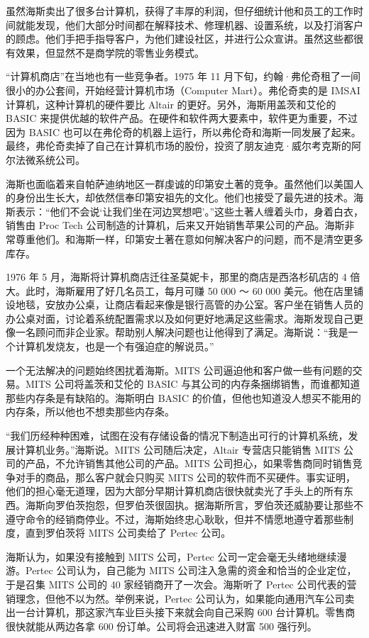 \documentclass[12pt,UTF8]{ctexbook}
\begin{document}
虽然海斯卖出了很多台计算机，获得了丰厚的利润，但仔细统计他和员工的工作时间就能发现，他们大部分时间都在解释技术、修理机器、设置系统，以及打消客户的顾虑。他们手把手指导客户，为他们建设社区，并进行公众宣讲。虽然这些都很有效果，但显然不是商学院的零售业务模式。

“计算机商店”在当地也有一些竞争者。1975 年 11 月下旬，约翰·弗伦奇租了一间很小的办公套间，开始经营计算机市场（Computer Mart）。弗伦奇卖的是 IMSAI 计算机，这种计算机的硬件要比 Altair 的更好。另外，海斯用盖茨和艾伦的 BASIC 来提供优越的软件产品。在硬件和软件两大要素中，软件更为重要，不过因为 BASIC 也可以在弗伦奇的机器上运行，所以弗伦奇和海斯一同发展了起来。最终，弗伦奇卖掉了自己在计算机市场的股份，投资了朋友迪克·威尔考克斯的阿尔法微系统公司。

海斯也面临着来自帕萨迪纳地区一群虔诚的印第安土著的竞争。虽然他们以美国人的身份出生长大，却依然信奉印第安祖先的文化。他们也接受了最先进的技术。海斯表示：“他们不会说‘让我们坐在河边冥想吧’。”这些土著人缠着头巾，身着白衣，销售由 Proc Tech 公司制造的计算机，后来又开始销售苹果公司的产品。海斯非常尊重他们。和海斯一样，印第安土著在意如何解决客户的问题，而不是清空更多库存。

1976 年 5 月，海斯将计算机商店迁往圣莫妮卡，那里的商店是西洛杉矶店的 4 倍大。此时，海斯雇用了好几名员工，每月可赚 50 000 ～ 60 000 美元。他在店里铺设地毯，安放办公桌，让商店看起来像是银行高管的办公室。客户坐在销售人员的办公桌对面，讨论着系统配置需求以及如何更好地满足这些需求。海斯发现自己更像一名顾问而非企业家。帮助别人解决问题也让他得到了满足。海斯说：“我是一个计算机发烧友，也是一个有强迫症的解说员。”

一个无法解决的问题始终困扰着海斯。MITS 公司逼迫他和客户做一些有问题的交易。MITS 公司将盖茨和艾伦的 BASIC 与其公司的内存条捆绑销售，而谁都知道那些内存条是有缺陷的。海斯明白 BASIC 的价值，但他也知道没人想买不能用的内存条，所以他也不想卖那些内存条。

“我们历经种种困难，试图在没有存储设备的情况下制造出可行的计算机系统，发展计算机业务。”海斯说。MITS 公司随后决定，Altair 专营店只能销售 MITS 公司的产品，不允许销售其他公司的产品。MITS 公司担心，如果零售商同时销售竞争对手的商品，那么客户就会只购买 MITS 公司的软件而不买硬件。事实证明，他们的担心毫无道理，因为大部分早期计算机商店很快就卖光了手头上的所有东西。海斯向罗伯茨抱怨，但罗伯茨很固执。据海斯所言，罗伯茨还威胁要让那些不遵守命令的经销商停业。不过，海斯始终忠心耿耿，但并不情愿地遵守着那些制度，直到罗伯茨将 MITS 公司卖给了 Pertec 公司。

海斯认为，如果没有接触到 MITS 公司，Pertec 公司一定会毫无头绪地继续漫游。Pertec 公司认为，自己能为 MITS 公司注入急需的资金和恰当的企业定位，于是召集 MITS 公司的 40 家经销商开了一次会。海斯听了 Pertec 公司代表的营销理念，但他不以为然。举例来说，Pertec 公司认为，如果能向通用汽车公司卖出一台计算机，那这家汽车业巨头接下来就会向自己采购 600 台计算机。零售商很快就能从两边各拿 600 份订单。公司将会迅速进入财富 500 强行列。
\end{document}
